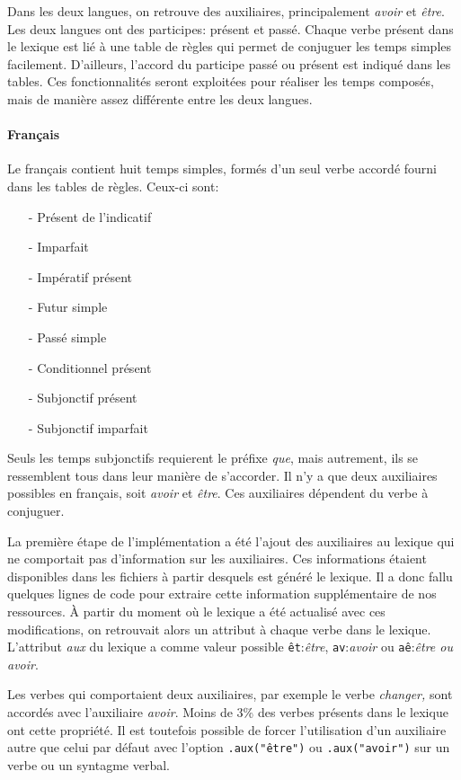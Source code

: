 \documentclass[11pt]{article} %
\begin{document}
Dans les deux langues, on retrouve des auxiliaires, principalement 
\emph{avoir} et \emph{être}. Les deux langues ont des participes: 
présent et passé. Chaque verbe présent dans le lexique est 
lié à une table de règles qui 
permet de conjuguer les temps simples facilement. D'ailleurs, l'accord 
du participe passé ou présent est indiqué dans les tables. Ces fonctionnalités 
seront exploitées pour réaliser les temps composés, mais de manière assez 
différente entre les deux langues.

\paragraph{Français}

Le français contient huit temps simples, formés d'un seul verbe accordé fourni
dans les tables de règles. Ceux-ci sont:
\begin{itemize}
\item[-] Présent de l'indicatif
\item[-] Imparfait
\item[-] Impératif présent
\item[-] Futur simple
\item[-] Passé simple
\item[-] Conditionnel présent
\item[-] Subjonctif présent
\item[-] Subjonctif imparfait
\end{itemize}
Seuls les temps subjonctifs requierent le préfixe \emph{que}, 
mais autrement, ils se ressemblent tous dans leur manière de s'accorder. Il n'y 
a que deux auxiliaires possibles en français, soit \emph{avoir} et \emph{être}.
Ces auxiliaires dépendent du verbe à conjuguer.

La première étape de l'implémentation
a été l'ajout des auxiliaires au lexique qui ne comportait pas
d'information sur les auxiliaires. Ces informations
étaient disponibles dans les fichiers à partir desquels est généré
le lexique. Il a donc fallu quelques lignes de code pour extraire
cette information supplémentaire de nos ressources. À partir du moment
où le lexique a été actualisé avec ces modifications, on retrouvait
alors un attribut à chaque verbe dans le lexique. L'attribut \emph{aux
}du lexique a comme valeur possible \texttt{êt}:\emph{être}, \texttt{av}:\emph{avoir}
ou \texttt{aê}:\emph{être ou avoir}.

Les verbes qui comportaient
deux auxiliaires, par exemple le verbe \emph{changer,} sont accordés
avec l'auxiliaire \emph{avoir}. Moins de 3\% des verbes présents dans le
lexique ont cette propriété. Il est toutefois possible de forcer l'utilisation 
d'un auxiliaire autre que celui par défaut
avec l'option \texttt{.aux("être")} ou \texttt{.aux("avoir")} sur un verbe ou un syntagme verbal.
\end{document}
